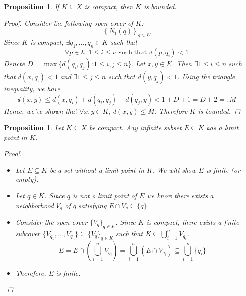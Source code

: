 \documentclass[10pt]{article}
\newtheorem{proposition}[theorem]{Proposition}
\theoremstyle{definition}
\theoremstyle{remark}
\begin{document}
\begin{proposition}
    If $K \subseteq X$ is compact, then $K$ is bounded.
    \begin{proof}
        Consider the following open cover of $K$:
        $$\left\{N_1(q) \right\}_{q \in K}$$
        Since $K$ is compact, $\exists q_1, \ldots, q_n \in K$ such that
        $$\forall p \in k \exists 1 \leq i \leq n \text{ such that } d(p, q_i) < 1$$
        Denote $D = \max\{d(q_i, q_j) \colon 1 \leq i, j \leq n\}$. Let $x, y \in K$. Then
        $\exists 1 \leq i \leq n$ such that $d(x, q_i) < 1$ and $\exists 1 \leq j \leq n$ such that $d(y, q_j) < 1$.
        Using the triangle inequality, we have
        $$d(x, y) \leq d(x, q_i) + d(q_i, q_j) + d(q_j, y) < 1 + D + 1 = D + 2 =: M$$
        Hence, we've shown that $\forall x, y \in K$, $d(x, y) \leq M$. Therefore $K$ is bounded.
    \end{proof}
\end{proposition}

\begin{proposition}
    Let $K \subseteq X$ be compact. Any infinite subset $E \subseteq K$ has a limit point in $K$.
    \begin{proof}
        \hfill
        \begin{itemize}
            \item
        Let $E \subseteq K$ be a set without a limit point in $K$. We will show $E$ is finite (or empty).
            \item
        Let $q \in K$. Since $q$ is not a limit point of $E$ we know there exists a neighborhood $V_q$ of $q$ satisfying $E \cap V_q \subseteq \{q\}$
            \item
        Consider the open cover $\{V_q\}_{q \in K}$. Since $K$ is compact, there exists a finite subcover $\{V_{q_1}, \ldots, V_{q_n}\} \subseteq \{V_q\}_{q \in K}$
        such that $K \subseteq \bigcup_{i=1}^n V_{q_i}$. 
        $$E = E \cap \left(\bigcup_{i=1}^n V_{q_i}\right) = \bigcup_{i=1}^n (E \cap V_{q_i}) \subseteq \bigcup_{i=1}^n \{q_i\}$$
            \item
        Therefore, $E$ is finite.
        \end{itemize}
    \end{proof}
\end{proposition}
\end{document}
